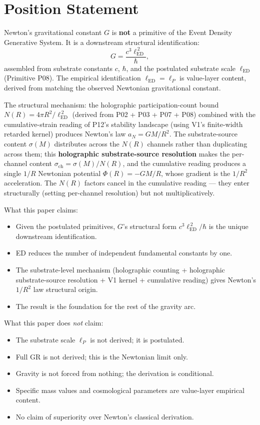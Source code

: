 \documentclass[11pt,a4paper]{article}
\begin{document}
\section{Position Statement}

Newton's gravitational constant $G$ is \textbf{not} a primitive of the Event Density Generative System. It is a downstream structural identification:
\[
G = \frac{c^3 \ell_\mathrm{ED}^{\,2}}{\hbar},
\]
assembled from substrate constants $c$, $\hbar$, and the postulated substrate scale $\ell_\mathrm{ED}$ (Primitive P08). The empirical identification $\ell_\mathrm{ED} = \ell_P$ is value-layer content, derived from matching the observed Newtonian gravitational constant.

The structural mechanism: the holographic participation-count bound $N(R) = 4\pi R^2/\ell_\mathrm{ED}^{\,2}$ (derived from P02 + P03 + P07 + P08) combined with the cumulative-strain reading of P12's stability landscape (using V1's finite-width retarded kernel) produces Newton's law $a_N = GM/R^2$. The substrate-source content $\sigma(M)$ distributes across the $N(R)$ channels rather than duplicating across them; this \textbf{holographic substrate-source resolution} makes the per-channel content $\sigma_\mathrm{ch} = \sigma(M)/N(R)$, and the cumulative reading produces a single $1/R$ Newtonian potential $\Phi(R) = -GM/R$, whose gradient is the $1/R^2$ acceleration. The $N(R)$ factors cancel in the cumulative reading --- they enter structurally (setting per-channel resolution) but not multiplicatively.

What this paper claims:

\begin{itemize}[noitemsep]
\item Given the postulated primitives, $G$'s structural form $c^3\ell_\mathrm{ED}^{\,2}/\hbar$ is the unique downstream identification.
\item ED reduces the number of independent fundamental constants by one.
\item The substrate-level mechanism (holographic counting + holographic substrate-source resolution + V1 kernel + cumulative reading) gives Newton's $1/R^2$ law structural origin.
\item The result is the foundation for the rest of the gravity arc.
\end{itemize}

What this paper does \emph{not} claim:

\begin{itemize}[noitemsep]
\item The substrate scale $\ell_P$ is not derived; it is postulated.
\item Full GR is not derived; this is the Newtonian limit only.
\item Gravity is not forced from nothing; the derivation is conditional.
\item Specific mass values and cosmological parameters are value-layer empirical content.
\item No claim of superiority over Newton's classical derivation.
\end{itemize}
\end{document}
